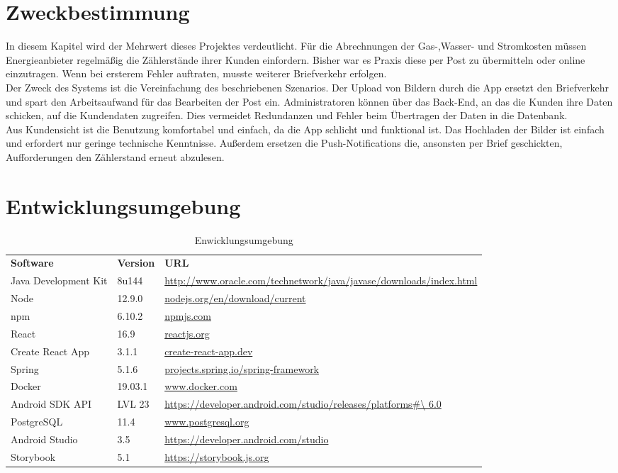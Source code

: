 \section{Zweckbestimmung}\label{sec:zweckbestimmung}
In diesem Kapitel wird der Mehrwert dieses Projektes verdeutlicht.
Für die Abrechnungen der Gas-,Wasser- und Stromkosten müssen Energieanbieter regelmäßig die Zählerstände ihrer Kunden einfordern. Bisher war es Praxis diese per Post zu übermitteln oder online einzutragen. Wenn bei ersterem Fehler auftraten, musste weiterer Briefverkehr erfolgen.\\
Der Zweck des Systems ist die Vereinfachung des beschriebenen Szenarios. Der Upload von Bildern durch die App ersetzt den Briefverkehr und spart den Arbeitsaufwand für das Bearbeiten der Post ein. Administratoren können über das Back-End, an das die Kunden ihre Daten schicken, auf die Kundendaten zugreifen. Dies vermeidet Redundanzen und Fehler beim Übertragen der Daten in die Datenbank.\\
Aus Kundensicht ist die Benutzung komfortabel und einfach, da die App schlicht und funktional ist. Das Hochladen der Bilder ist einfach und erfordert nur geringe technische Kenntnisse. Außerdem ersetzen die Push-Notifications die, ansonsten per Brief geschickten, Aufforderungen den Zählerstand erneut abzulesen.


\section{Entwicklungsumgebung}\label{sec:entwicklungsumgebung}

\begin{table}[h]
	\centering
	\begin{tabularx}{\textwidth}{l l X}
		\rowcolor[HTML]{C0C0C0} 
		\textbf{Software} & \textbf{Version} & \textbf{URL} \\
		Java Development Kit & 8u144 & \url{http://www.oracle.com/technetwork/java/javase/downloads/index.html} \\
		\rowcolor[HTML]{E7E7E7} 
		Node & 12.9.0 & \url{nodejs.org/en/download/current} \\
		npm & 6.10.2 & \url{npmjs.com} \\
		\rowcolor[HTML]{E7E7E7} 
		React &16.9 &\url{reactjs.org}\\
		Create React App & 3.1.1 & \url{create-react-app.dev} \\
		\rowcolor[HTML]{E7E7E7} 
		Spring & 5.1.6 & \url{projects.spring.io/spring-framework} \\
		Docker & 19.03.1& \url{www.docker.com} \\
		\rowcolor[HTML]{E7E7E7} 
		Android SDK API&LVL 23 & \url {https://developer.android.com/studio/releases/platforms\#\ 6.0} \\
		PostgreSQL &11.4 & \url{www.postgresql.org} \\
		\rowcolor[HTML]{E7E7E7}
		Android Studio & 3.5 & \url{https://developer.android.com/studio} \\
		Storybook & 5.1 &\url {https://storybook.js.org} \\
	\end{tabularx}
	\caption{Enwicklungsumgebung}
	\label{table:entwicklungsumgebung}
\end{table}